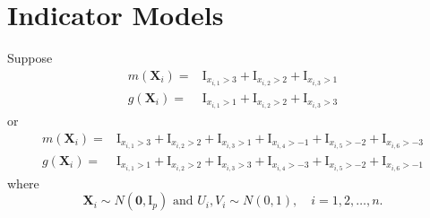\documentclass[en,12pt,mtpro2]{elegantpaper}
\begin{document}
\section{Indicator Models}

Suppose
\begin{equation}
    \begin{aligned}
        m\left(\mathbf{X}_{i}\right)= & \mathrm{I}_{x_{i,1}>3}+\mathrm{I}_{x_{i,2}>2}+\mathrm{I}_{x_{i,3}>1} \\
        g\left(\mathbf{X}_{i}\right)= & \mathrm{I}_{x_{i,1}>1}+\mathrm{I}_{x_{i,2}>2}+\mathrm{I}_{x_{i,3}>3}
    \end{aligned}
    \label{eq:indicator-model-1}
\end{equation}
or
\begin{equation}
    \begin{aligned}
        m\left(\mathbf{X}_{i}\right)= & \mathrm{I}_{x_{i,1}>3}+\mathrm{I}_{x_{i,2}>2}+\mathrm{I}_{x_{i,3}>1}+\mathrm{I}_{x_{i,4}>-1}+\mathrm{I}_{x_{i,5}>-2}+\mathrm{I}_{x_{i,6}>-3} \\
        g\left(\mathbf{X}_{i}\right)= & \mathrm{I}_{x_{i,1}>1}+\mathrm{I}_{x_{i,2}>2}+\mathrm{I}_{x_{i,3}>3}+\mathrm{I}_{x_{i,4}>-3}+\mathrm{I}_{x_{i,5}>-2}+\mathrm{I}_{x_{i,6}>-1}
    \label{eq:indicator-model-2}
\end{aligned}
\end{equation}
where
\begin{equation*}
    \mathbf{X}_{i}\sim N\left(\boldsymbol{0},\mathrm{I}_{p}\right)\text{ and }U_{i},V_{i}\sim N\left(0,1\right),\quad i=1,2,\ldots,n.
\end{equation*}
\end{document}
